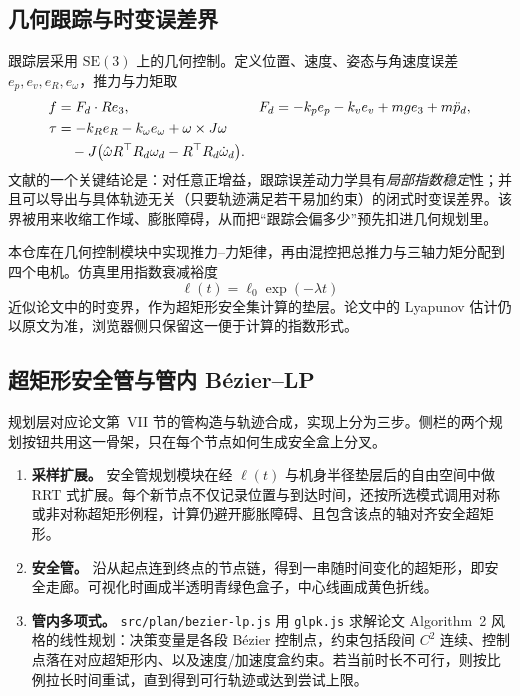 \documentclass[UTF8,a4paper,11pt,zihao=-4]{ctexart}
\begin{document}
\subsection{几何跟踪与时变误差界}

跟踪层采用 $\mathrm{SE}(3)$ 上的几何控制\cite{lee2010geometric,serry2026reachavoid}。定义位置、速度、姿态与角速度误差 $e_p,e_v,e_R,e_\omega$，推力与力矩取
\begin{align}
f&=F_d\cdot R e_3, &
F_d&=-k_p e_p-k_v e_v+mge_3+m\ddot{p}_d, \\
\tau&=-k_R e_R-k_\omega e_\omega+\omega\times J\omega \notag\\
&\quad-J\bigl(\hat{\omega}R^\top R_d\omega_d-R^\top R_d\dot{\omega}_d\bigr).
\end{align}
文献\cite{serry2026reachavoid}的一个关键结论是：对任意正增益，跟踪误差动力学具有\emph{局部指数稳定}性；并且可以导出与具体轨迹无关（只要轨迹满足若干易加约束）的闭式时变误差界。该界被用来收缩工作域、膨胀障碍，从而把``跟踪会偏多少''预先扣进几何规划里。

本仓库在几何控制模块中实现推力--力矩律，再由混控把总推力与三轴力矩分配到四个电机。仿真里用指数衰减裕度
\[
\ell(t)=\ell_0\exp(-\lambda t)
\]
近似论文中的时变界，作为超矩形安全集计算的垫层。论文中的 Lyapunov 估计仍以原文为准，浏览器侧只保留这一便于计算的指数形式。

\subsection{超矩形安全管与管内 B\'ezier--LP}

规划层对应论文第~VII 节的管构造与轨迹合成，实现上分为三步。侧栏的两个规划按钮共用这一骨架，只在每个节点如何生成安全盒上分叉。

\begin{enumerate}
  \item \textbf{采样扩展。}
        安全管规划模块在经 $\ell(t)$ 与机身半径垫层后的自由空间中做 RRT 式扩展\cite{lavalle1998rrt}。每个新节点不仅记录位置与到达时间，还按所选模式调用对称或非对称超矩形例程，计算仍避开膨胀障碍、且包含该点的轴对齐安全超矩形。

  \item \textbf{安全管。}
        沿从起点连到终点的节点链，得到一串随时间变化的超矩形，即安全走廊。可视化时画成半透明青绿色盒子，中心线画成黄色折线。

  \item \textbf{管内多项式。}
        \texttt{src/plan/bezier-lp.js} 用 \texttt{glpk.js}\cite{glpkjs} 求解论文 Algorithm~2 风格的线性规划：决策变量是各段 B\'ezier 控制点，约束包括段间 $C^2$ 连续、控制点落在对应超矩形内、以及速度/加速度盒约束。若当前时长不可行，则按比例拉长时间重试，直到得到可行轨迹或达到尝试上限。
\end{enumerate}
\end{document}
